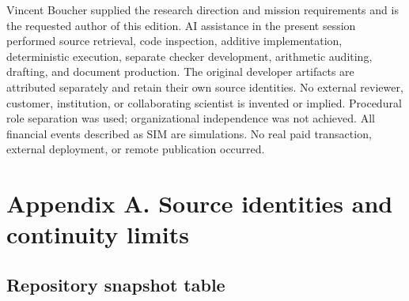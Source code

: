 Vincent Boucher supplied the research direction and mission requirements
and is the requested author of this edition. AI assistance in the
present session performed source retrieval, code inspection, additive
implementation, deterministic execution, separate checker development,
arithmetic auditing, drafting, and document production. The original
developer artifacts are attributed separately and retain their own
source identities. No external reviewer, customer, institution, or
collaborating scientist is invented or implied. Procedural role
separation was used; organizational independence was not achieved. All
financial events described as SIM are simulations. No real paid
transaction, external deployment, or remote publication occurred.

\section*{Appendix A. Source identities and continuity
limits}\label{appendix-sources}

\subsection*{Repository snapshot table}\label{repository-snapshot-table}

